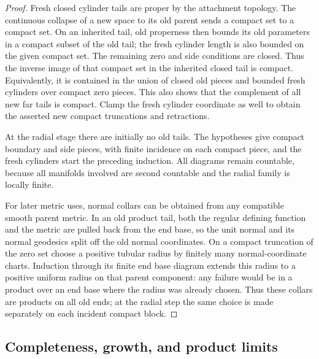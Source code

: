 \begin{proof}
Fresh closed cylinder tails are proper by the attachment topology.  The continuous collapse
of a new space to its old parent sends a compact set to a compact set.
On an inherited tail, old properness then bounds its old parameters
in a compact subset of the old tail; the fresh cylinder length is
also bounded on the given compact set.  The remaining zero and side
conditions are closed.  Thus the inverse image of that compact set
in the inherited closed tail is compact.  Equivalently, it is contained
in the union of closed old pieces and bounded fresh cylinders over
compact zero pieces.  This also shows that the complement of all new
far tails is compact.  Clamp the fresh cylinder coordinate as well
to obtain the asserted new compact truncations and retractions.

At the radial stage there are initially no old tails.  The hypotheses
give compact boundary and side pieces, with finite incidence on each
compact piece, and the fresh cylinders start the preceding induction.
All diagrams remain countable, because all manifolds involved are
second countable and the radial family is locally finite.

For later metric uses, normal collars can be obtained from any
compatible smooth parent metric.  In an old product tail, both the
regular defining function and the metric are pulled back from the
end base, so the unit normal and its normal geodesics split off the old
normal coordinates.  On a compact truncation of the zero set choose
a positive tubular radius by finitely many normal-coordinate charts.
Induction through its finite end base diagram extends this radius to a
positive uniform radius on that parent component: any failure would
be in a product over an end base where the radius was already chosen.
Thus these collars are products on all old ends; at the radial step
the same choice is made separately on each incident compact block.
\end{proof}

\subsection{Completeness, growth, and product limits}

